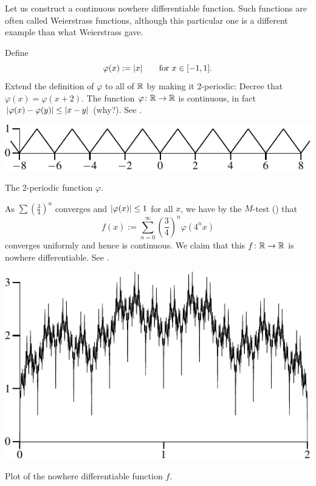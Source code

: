 \begin{example}
Let us construct a continuous nowhere differentiable function.
Such functions are often called Weierstrass functions, although this
particular one is a different example than what Weierstrass gave.

Define
\begin{equation*}
\varphi(x) :=\lvert {x} \rvert \qquad \text{for $x \in [-1,1]$} .
\end{equation*}
Extend the definition of $\varphi$ to all of ${\mathbb{R}}$ by making it
2-periodic:
Decree that
$\varphi(x) = \varphi(x+2)$.  The function $\varphi \colon {\mathbb{R}} \to {\mathbb{R}}$
is continuous, in fact $\lvert {\varphi(x)-\varphi(y)} \rvert \leq \lvert {x-y} \rvert$ (why?).
See .
\begin{myfigureht}
\includegraphics{figures/triangwave}
\caption{The 2-periodic function $\varphi$.\label{fig:triangwave}}
\end{myfigureht}

As $\sum {\left(\frac{3}{4}\right)}^n$ converges and $\lvert {\varphi(x)} \rvert \leq
1$ for all $x$, we have by the $M$-test
() that
\begin{equation*}
f(x) := \sum_{n=0}^\infty 
{\left(\frac{3}{4}\right)}^n \varphi(4^n x)
\end{equation*}
converges uniformly and hence is continuous.  We claim that this $f \colon
{\mathbb{R}} \to {\mathbb{R}}$ is nowhere differentiable.
See .

\begin{myfigureht}
\includegraphics{figures/nowherediff}
\caption{Plot of the nowhere differentiable function $f$.\label{fig:nowherediff}}
\end{myfigureht}


\end{example}

